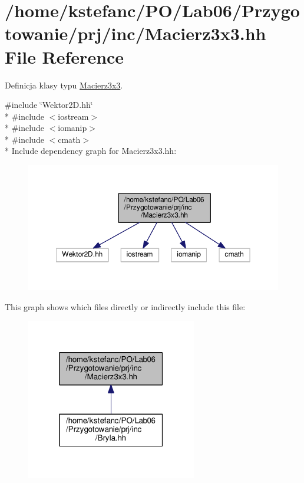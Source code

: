 \hypertarget{_macierz3x3_8hh}{\section{/home/kstefanc/\+P\+O/\+Lab06/\+Przygotowanie/prj/inc/\+Macierz3x3.hh File Reference}
\label{_macierz3x3_8hh}
}


Definicja klasy typu \hyperlink{class_macierz3x3}{Macierz3x3}.  


{\ttfamily \#include \char`\"{}Wektor2\+D.\+hh\char`\"{}}\\*
{\ttfamily \#include $<$iostream$>$}\\*
{\ttfamily \#include $<$iomanip$>$}\\*
{\ttfamily \#include $<$cmath$>$}\\*
Include dependency graph for Macierz3x3.\+hh\+:
\nopagebreak
\begin{figure}[H]
\begin{center}
\leavevmode
\includegraphics[width=350pt]{_macierz3x3_8hh__incl}
\end{center}
\end{figure}
This graph shows which files directly or indirectly include this file\+:
\nopagebreak
\begin{figure}[H]
\begin{center}
\leavevmode
\includegraphics[width=211pt]{_macierz3x3_8hh__dep__incl}
\end{center}
\end{figure}
